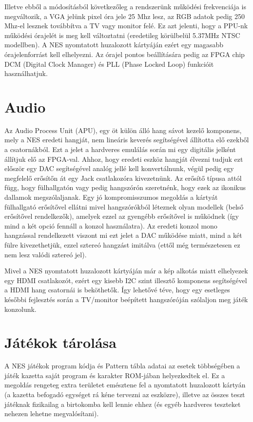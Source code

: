 Illetve ebből a módosításból következőleg a rendszerünk működési frekvenciája is megváltozik, a VGA jelünk pixel óra jele 25 Mhz lesz, az RGB adatok pedig 250 Mhz-el lesznek továbbítva a TV vagy monitor felé. Ez azt jelenti, hogy a PPU-nk működési órajelét is meg kell változtatni (eredetileg körülbelül 5.37MHz NTSC modellben). A NES nyomtatott huzalozott kártyáján ezért egy magasabb órajelenforrást kell elhelyezni. Az órajel pontos beállítására pedig az FPGA chip DCM (Digital Clock Manager) és PLL (Phase Locked Loop) funkcióit használhatjuk.  

\section{Audio}
Az Audio Process Unit (APU), egy öt külön álló hang sávot kezelő komponens, mely a NES eredeti hangját, nem lineáris keverés segítségével állította elő ezekből a csatornákból. Ezt a jelet a hardveres emulálás során mi egy digitális jelként állítjuk elő az FPGA-val. Ahhoz, hogy eredeti eszköz hangját élvezni tudjuk ezt először egy DAC segítségével analóg jellé kell konvertálnunk, végül pedig egy megfelelő erősítőn át egy Jack csatlakozóra kivezetnünk. Az erősítő típusa attól függ, hogy fülhallgatón vagy pedig hangszórón szeretnénk, hogy ezek az ikonikus dallamok megszólaljanak. Egy jó kompromisszumos megoldás a kártyát fülhallgató erősítővel ellátni mivel hangszórókból léteznek olyan modellek (belső erősítővel rendelkezők), amelyek ezzel az gyengébb erősítővel is működnek (így mind a két opció fennáll a konzol használatra). Az eredeti konzol mono hangzással rendelkezett viszont mi ezt jelet a DAC működése miatt, mind a két fülre kivezethetjük, ezzel sztereó hangzást imitálva (ettől még természetesen ez nem lesz valódi sztereó jel).   

Mivel a NES nyomtatott huzalozott kártyáján már a kép alkotás miatt elhelyezek egy HDMI csatlakozót, ezért egy kisebb I2C szint illesztő komponens segítségével a HDMI hang csatornái is beköthetők. Így lehetővé téve, hogy egy esetleges későbbi fejlesztés során a TV/monitor beépített hangszóróján szólaljon meg játék konzolunk. 

\section{Játékok tárolása}
\label{sec:Game-store}
A NES játékok program kódja és Pattern tábla adatai az esetek többségében a játék kazetta saját program és karakter ROM-jában helyezkedtek el. Ez a megoldás rengeteg extra területet emésztene fel a nyomtatott huzalozott kártyán (a kazetta befogadó egységet rá kéne tervezni az eszközre), illetve az összes teszt játéknak fizikailag a birtokomba kell lennie ehhez (és egyéb hardveres teszteket nehezen lehetne megvalósítani). 

